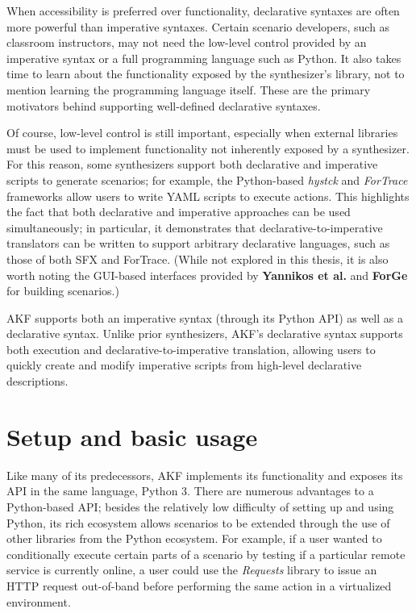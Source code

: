 \documentclass[letterpaper,12pt]{report}
\begin{document}
When accessibility is preferred over functionality, declarative syntaxes
are often more powerful than imperative syntaxes. Certain scenario
developers, such as classroom instructors, may not need the low-level
control provided by an imperative syntax or a full programming language
such as Python. It also takes time to learn about the functionality
exposed by the synthesizer's library, not to mention learning the
programming language itself. These are the primary motivators behind
supporting well-defined declarative syntaxes.

Of course, low-level control is still important, especially when
external libraries must be used to implement functionality not
inherently exposed by a synthesizer. For this reason, some synthesizers
support both declarative and imperative scripts to generate scenarios;
for example, the Python-based \emph{hystck} and \emph{ForTrace}
frameworks allow users to write YAML scripts to execute actions. This
highlights the fact that both declarative and imperative approaches can
be used simultaneously; in particular, it demonstrates that
declarative-to-imperative translators can be written to support
arbitrary declarative languages, such as those of both SFX and ForTrace.
(While not explored in this thesis, it is also worth noting the
GUI-based interfaces provided by \textbf{Yannikos et al.} and
\textbf{ForGe} for building scenarios.)

AKF supports both an imperative syntax (through its Python API) as well
as a declarative syntax. Unlike prior synthesizers, AKF's declarative
syntax supports both execution and declarative-to-imperative
translation, allowing users to quickly create and modify imperative
scripts from high-level declarative descriptions.

\section{Setup and basic usage}\label{setup-and-basic-usage}

Like many of its predecessors, AKF implements its functionality and
exposes its API in the same language, Python 3. There are numerous
advantages to a Python-based API; besides the relatively low difficulty
of setting up and using Python, its rich ecosystem allows scenarios to
be extended through the use of other libraries from the Python
ecosystem. For example, if a user wanted to conditionally execute
certain parts of a scenario by testing if a particular remote service is
currently online, a user could use the \emph{Requests} library
\cite{Requests31Documentation} to issue an HTTP request out-of-band
before performing the same action in a virtualized environment.
\end{document}
